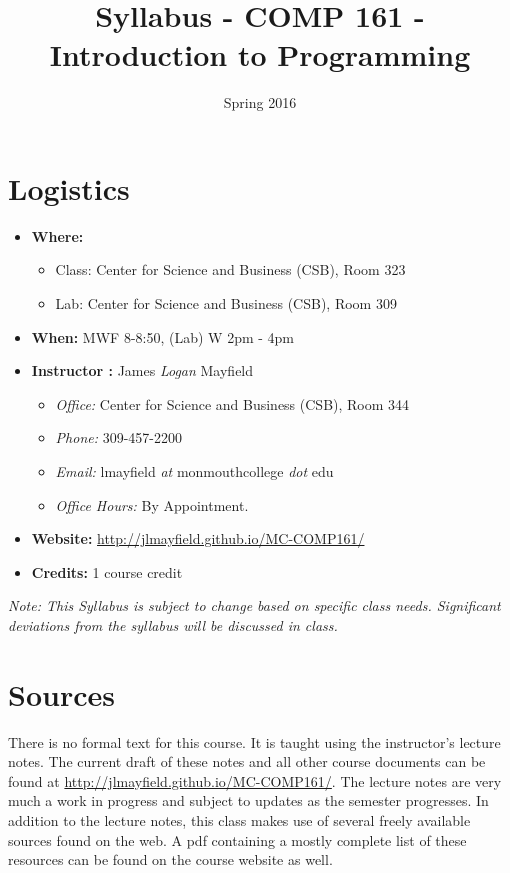 \documentclass[10pt]{article}
\title{Syllabus - COMP 161 - Introduction to Programming}
\author{  }
\date{Spring 2016}
\begin{document}
\maketitle

\section{Logistics}
\begin{itemize}
\item \textbf{Where: } 
\begin{itemize} 
\item Class: Center for Science and Business (CSB), Room 323	
\item Lab: Center for Science and Business (CSB), Room 309
\end{itemize}
\item \textbf{When: } MWF 8-8:50, (Lab) W 2pm - 4pm
\item \textbf{Instructor :} James \textit{Logan} Mayfield
\begin{itemize}
\item \textit{Office: } Center for Science and Business (CSB), Room 344
\item \textit{Phone: } 309-457-2200
\item \textit{Email: } lmayfield \textit{at} monmouthcollege \textit{dot} edu
\item \textit{Office Hours: }  By Appointment.
\end{itemize}
\item \textbf{Website: } \url{http://jlmayfield.github.io/MC-COMP161/}
\item \textbf{Credits: } 1 course credit
\end{itemize}
\emph{Note: This Syllabus is subject to change based on specific class needs. Significant deviations from the syllabus will be discussed in class.}

\section{Sources}

There is no formal text for this course. It is taught using the instructor's lecture notes. The current draft of these notes and all other course documents can be found at \url{http://jlmayfield.github.io/MC-COMP161/}. The lecture notes are very much a work in progress and subject to updates as the semester progresses. In addition to the lecture notes, this class makes use of several freely available sources found on the web. A pdf containing a mostly complete list of these resources can be found on the course website as well.  
\end{document}

